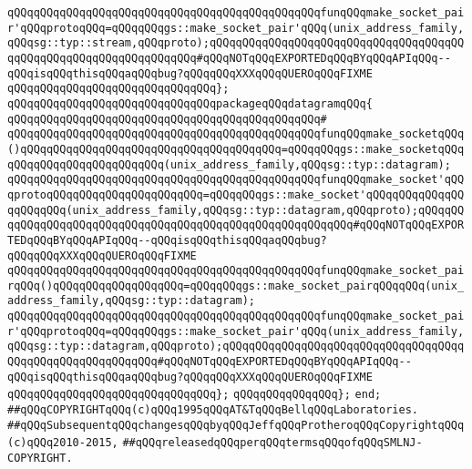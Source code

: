 \verb|qQQqqQQqqQQqqQQqqQQqqQQqqQQqqQQqqQQqqQQqqQQqqQQqfunqQQqmake_socket_pair'qQQqprotoqQQq=qQQqqQQqgs::make_socket_pair'qQQq(unix_address_family,qQQqsg::typ::stream,qQQqproto);qQQqqQQqqQQqqQQqqQQqqQQqqQQqqQQqqQQqqQQqqQQqqQQqqQQqqQQqqQQqqQQqqQQq#qQQqNOTqQQqEXPORTEDqQQqBYqQQqAPIqQQq--qQQqisqQQqthisqQQqaqQQqbug?qQQqqQQqXXXqQQqQUEROqQQqFIXME|\newline
\verb|qQQqqQQqqQQqqQQqqQQqqQQqqQQqqQQq};|\newline
\newline
\verb|qQQqqQQqqQQqqQQqqQQqqQQqqQQqqQQqpackageqQQqdatagramqQQq{|\newline
\verb|qQQqqQQqqQQqqQQqqQQqqQQqqQQqqQQqqQQqqQQqqQQqqQQq#|\newline
\verb|qQQqqQQqqQQqqQQqqQQqqQQqqQQqqQQqqQQqqQQqqQQqqQQqfunqQQqmake_socketqQQq()qQQqqQQqqQQqqQQqqQQqqQQqqQQqqQQqqQQqqQQq=qQQqqQQqgs::make_socketqQQqqQQqqQQqqQQqqQQqqQQqqQQq(unix_address_family,qQQqsg::typ::datagram);|\newline
\verb|qQQqqQQqqQQqqQQqqQQqqQQqqQQqqQQqqQQqqQQqqQQqqQQqfunqQQqmake_socket'qQQqprotoqQQqqQQqqQQqqQQqqQQqqQQq=qQQqqQQqgs::make_socket'qQQqqQQqqQQqqQQqqQQqqQQq(unix_address_family,qQQqsg::typ::datagram,qQQqproto);qQQqqQQqqQQqqQQqqQQqqQQqqQQqqQQqqQQqqQQqqQQqqQQqqQQqqQQqqQQq#qQQqNOTqQQqEXPORTEDqQQqBYqQQqAPIqQQq--qQQqisqQQqthisqQQqaqQQqbug?qQQqqQQqXXXqQQqQUEROqQQqFIXME|\newline
\verb|qQQqqQQqqQQqqQQqqQQqqQQqqQQqqQQqqQQqqQQqqQQqqQQqfunqQQqmake_socket_pairqQQq()qQQqqQQqqQQqqQQqqQQq=qQQqqQQqgs::make_socket_pairqQQqqQQq(unix_address_family,qQQqsg::typ::datagram);|\newline
\verb|qQQqqQQqqQQqqQQqqQQqqQQqqQQqqQQqqQQqqQQqqQQqqQQqfunqQQqmake_socket_pair'qQQqprotoqQQq=qQQqqQQqgs::make_socket_pair'qQQq(unix_address_family,qQQqsg::typ::datagram,qQQqproto);qQQqqQQqqQQqqQQqqQQqqQQqqQQqqQQqqQQqqQQqqQQqqQQqqQQqqQQqqQQq#qQQqNOTqQQqEXPORTEDqQQqBYqQQqAPIqQQq--qQQqisqQQqthisqQQqaqQQqbug?qQQqqQQqXXXqQQqQUEROqQQqFIXME|\newline
\verb|qQQqqQQqqQQqqQQqqQQqqQQqqQQqqQQq};|\newline
\verb|qQQqqQQqqQQqqQQq};|\newline
\verb|end;|\newline
\newline
\verb|##qQQqCOPYRIGHTqQQq(c)qQQq1995qQQqAT&TqQQqBellqQQqLaboratories.|\newline
\verb|##qQQqSubsequentqQQqchangesqQQqbyqQQqJeffqQQqProtheroqQQqCopyrightqQQq(c)qQQq2010-2015,|\newline
\verb|##qQQqreleasedqQQqperqQQqtermsqQQqofqQQqSMLNJ-COPYRIGHT.|\newline

